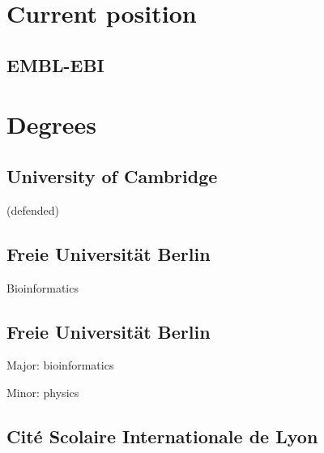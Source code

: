 \documentclass{klmr-cv}
\author{Konrad Rudolph}
\begin{document}
\maketitle

\sidebar

\section{Current position}

\subsection{EMBL-EBI}

\date{2015--2016}
\item{}

\section{Degrees}

\subsection{University of Cambridge}

\date{2015}
\item{ (defended)}

\subsection{Freie Universität Berlin}

\date{2011}
\item{}
\item{Bioinformatics}

\subsection{Freie Universität Berlin}

\date{2008}
\item{}
\item{Major: bioinformatics}
\item{Minor: physics}

\subsection{\textfrench{Cité Scolaire Internationale de Lyon}}
\end{document}
